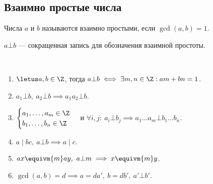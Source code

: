 \subsection{Взаимно простые числа}

\begin{defn}
    Числа $a$ и $b$ называются взаимно простыми, если $\gcd(a, b) = 1$.

    $a \bot b$ --- сокращенная запись для обозначения взаимной простоты.
\end{defn}

\begin{theorem-non}~
    \begin{enumerate}
        \item $\letus a, b \in \Z$, тогда $a \bot b \iff \exists m, n \in \Z: am + bn = 1$.
        
        \item $a_1 \bot b,~ a_2 \bot b \implies a_1a_2 \bot b$.
        
        \item $\begin{cases} 
            a_1, \ldots, a_m \in \Z \\ 
            b_1, \ldots, b_n \in \Z
        \end{cases}$ и $\forall i, j:\ a_i \bot b_j \implies a_1 \ldots a_m \bot b_1 \ldots b_n$.
        
        \item $a \mid bc,~ a \bot b \implies a \mid c$.
        
        \item $ax \equivm{m} ay,~ a \bot m \implies x \equivm{m} y$.
        
        \item $\gcd(a, b) = d \implies a = da',~ b = db',~ a' \bot b'$.
    \end{enumerate}
\end{theorem-non}

